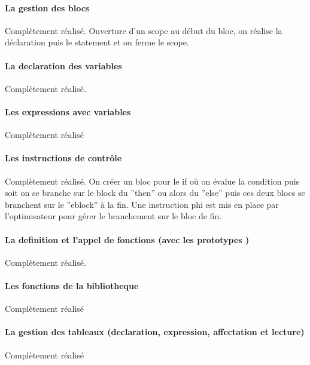 \documentclass{article}
\begin{document}
\paragraph{La gestion des blocs}
Complètement réalisé.
Ouverture d'un scope au début du bloc, on réalise la déclaration puis le statement et on ferme le 
scope.

\paragraph{La declaration des variables}
Complètement réalisé.

\paragraph{Les expressions avec variables}
Complètement réalisé

\paragraph{Les instructions de contrôle }
Complètement réalisé.
On créer un bloc pour le if où on évalue la condition puis soit on se branche sur le block du ''then'' 
ou alors du ''else'' puis ces deux blocs se branchent sur le ''eblock'' à la
fin. Une instruction phi est mis en place par l'optimisateur pour gérer le
branchement sur le bloc de fin.

\paragraph{La definition et l'appel de fonctions (avec les prototypes
)}
Complètement réalisé.


\paragraph{Les fonctions de la bibliotheque}
Complètement réalisé


\paragraph{La gestion des tableaux (declaration, expression, affectation et
  lecture)} 
Complètement réalisé
\end{document}
